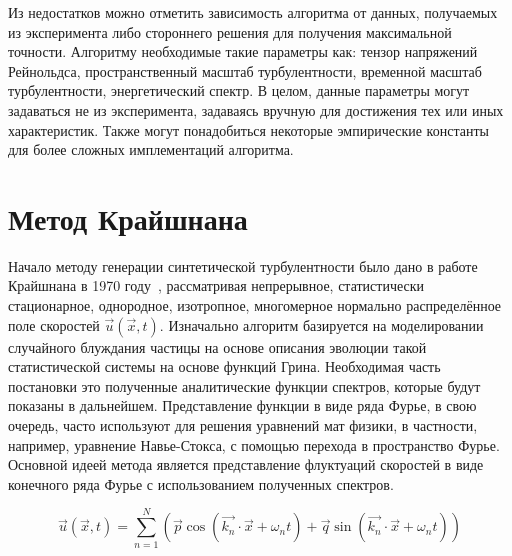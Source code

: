 Из недостатков можно отметить зависимость алгоритма от данных, получаемых из эксперимента либо стороннего решения для получения максимальной точности. Алгоритму необходимые такие параметры как: тензор напряжений Рейнольдса, пространственный масштаб турбулентности, временной масштаб турбулентности, энергетический спектр. В целом, данные параметры могут задаваться не из эксперимента, задаваясь вручную для достижения тех или иных характеристик. Также могут понадобиться некоторые эмпирические константы для более сложных имплементаций алгоритма. 

\section{Метод Крайшнана} \label{sect2_1}

Начало методу генерации синтетической турбулентности было дано в работе Крайшнана в 1970 году~\cite{Kraichnan70}, рассматривая непрерывное, статистически стационарное, однородное, изотропное, многомерное нормально распределённое поле скоростей $\Vec{u}(\vec{x}, t)$. Изначально алгоритм базируется на моделировании случайного блуждания частицы на основе описания эволюции такой статистической системы на основе функций Грина. Необходимая часть постановки это полученные аналитические функции спектров, которые будут показаны в дальнейшем. Представление функции в виде ряда Фурье, в свою очередь, часто используют для решения уравнений мат физики, в частности, например, уравнение Навье-Стокса, с помощью перехода в пространство Фурье. Основной идеей метода является представление флуктуаций скоростей в виде конечного ряда Фурье с использованием полученных спектров. 

\begin{equation}
  \label{eq:spectral_equation1}
  \vec{u} (\vec{x}, t) = \sum_{n=1}^{N} \left( \vec{p} \cos{(\vec{k_n} \cdot \vec{x} + \omega_n t)} + \vec{q} \sin{(\vec{k_n} \cdot \vec{x} + \omega_n t)} \right)
\end{equation}

